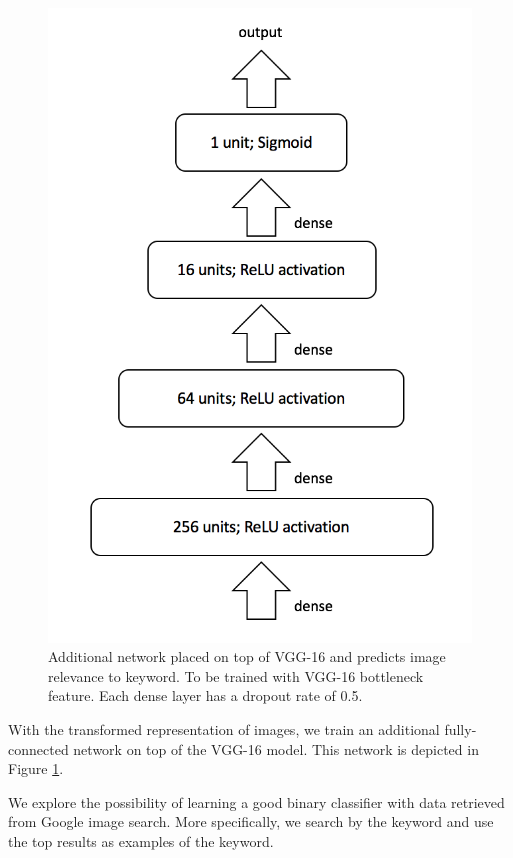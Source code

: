 \documentclass{article}
\begin{document}
\begin{figure}[h]
	\label{fig:model}
	\centering
	\includegraphics[scale=0.6]{image/dense.png}
	\caption{Additional network placed on top of VGG-16 and predicts image relevance to keyword. To be trained with VGG-16 bottleneck feature. Each dense layer has a dropout rate of 0.5. }
\end{figure}

With the transformed representation of images, we train an additional fully-connected network on top of the VGG-16 model. This network is depicted in Figure \ref{fig:model}. 

We explore the possibility of learning a good binary classifier with data retrieved from Google image search. More specifically, we search by the keyword and use the top results as examples of the keyword. 
\end{document}
